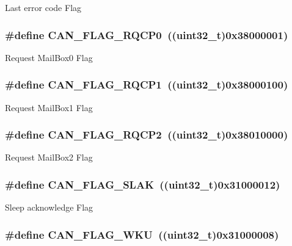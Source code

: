 \label{group__CAN__flags_ga73a774fa4d391aec0ea6552bf9372917}
Last error code Flag \hypertarget{group__CAN__flags_ga6df0579049eb471720ea103c5446298b}{
\subsubsection[{CAN\_\-FLAG\_\-RQCP0}]{\setlength{\rightskip}{0pt plus 5cm}\#define CAN\_\-FLAG\_\-RQCP0~((uint32\_\-t)0x38000001)}}
\label{group__CAN__flags_ga6df0579049eb471720ea103c5446298b}
Request MailBox0 Flag \hypertarget{group__CAN__flags_gaba705586ebc3d961507436c03a2feaba}{
\subsubsection[{CAN\_\-FLAG\_\-RQCP1}]{\setlength{\rightskip}{0pt plus 5cm}\#define CAN\_\-FLAG\_\-RQCP1~((uint32\_\-t)0x38000100)}}
\label{group__CAN__flags_gaba705586ebc3d961507436c03a2feaba}
Request MailBox1 Flag \hypertarget{group__CAN__flags_ga9c20cd47e558135bd7ae71149583d487}{
\subsubsection[{CAN\_\-FLAG\_\-RQCP2}]{\setlength{\rightskip}{0pt plus 5cm}\#define CAN\_\-FLAG\_\-RQCP2~((uint32\_\-t)0x38010000)}}
\label{group__CAN__flags_ga9c20cd47e558135bd7ae71149583d487}
Request MailBox2 Flag \hypertarget{group__CAN__flags_gad087b5025a3d5ead2c32b06663821cf4}{
\subsubsection[{CAN\_\-FLAG\_\-SLAK}]{\setlength{\rightskip}{0pt plus 5cm}\#define CAN\_\-FLAG\_\-SLAK~((uint32\_\-t)0x31000012)}}
\label{group__CAN__flags_gad087b5025a3d5ead2c32b06663821cf4}
Sleep acknowledge Flag \hypertarget{group__CAN__flags_ga18c72dbe75cb80e8b5126c23c9120818}{
\subsubsection[{CAN\_\-FLAG\_\-WKU}]{\setlength{\rightskip}{0pt plus 5cm}\#define CAN\_\-FLAG\_\-WKU~((uint32\_\-t)0x31000008)}}
